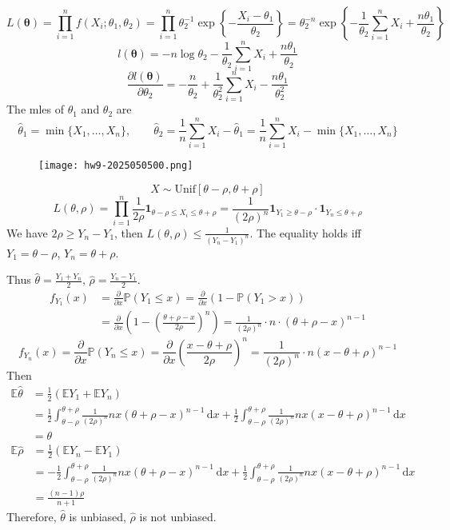 \[
L(\boldsymbol{\theta})=\prod_{i=1}^{n} f(X_i;\theta_1,\theta_2)=\prod_{i=1}^{n}\theta_2^{-1}\exp \left\{  -\frac{X_i-\theta_1}{\theta_2}  \right\}=\theta_2^{-n}\exp \left\{  -\frac{1}{\theta_2}\sum_{i=1}^{n} X_i+\frac{n\theta_1}{\theta_2}  \right\}
\]
\[
l(\boldsymbol{\theta})=-n\log\theta_2-\frac{1}{\theta_2}\sum_{i=1}^{n} X_i+\frac{n\theta_1}{\theta_2}
\]
\[
\frac{ \partial l(\boldsymbol{\theta}) }{ \partial \theta_2 } =-\frac{n}{\theta_2}+\frac{1}{\theta_2^2}\sum_{i=1}^{n} X_i-\frac{n\theta_1}{\theta_2^2}
\]
The mles of $\theta_1$ and $\theta_2$ are
\[
\widehat{\theta}_{1}=\min\{ X_1,\dots,X_n \},\qquad \widehat{\theta}_{2}=\frac{1}{n}\sum_{i=1}^{n} X_i-\widehat{\theta}_{1}=\frac{1}{n}\sum_{i=1}^{n} X_i-\min\{ X_1,\dots,X_n \}
\]
\begin{exercise}
\begin{figure}[H]
\centering
\texttt{[image: hw9-2025050500.png]}
\label{}
\end{figure}
\end{exercise}
\[
X\sim \text{Unif}[\theta-\rho,\theta+\rho]
\]
\[
L(\theta,\rho)=\prod_{i=1}^{n} \frac{1}{2\rho}\mathbf{1}_{\theta-\rho\leq X_i\leq \theta+\rho}=\frac{1}{(2\rho)^n}\mathbf{1}_{Y_1\geq \theta-\rho}\cdot \mathbf{1}_{Y_n\leq \theta+\rho}
\]
We have $2\rho\geq Y_n-Y_1$, then $L(\theta,\rho)\leq\frac{1}{(Y_n-Y_1)^n}$. The equality holds iff $Y_1=\theta-\rho$, $Y_n=\theta+\rho$.

Thus $\widehat{\theta}=\frac{Y_1+Y_n }{2}$, $\widehat{\rho}=\frac{Y_n-Y_1}{2}$.
\[
\begin{aligned}
f_{Y_1}(x) & =\frac{ \partial  }{ \partial x } \mathbb{P}(Y_1\leq x)=\frac{ \partial   }{ \partial x } (1-\mathbb{P}(Y_1>x)) \\
 & =\frac{ \partial   }{ \partial x } \left( 1-\left( \frac{\theta+\rho-x}{2\rho} \right)^n \right)=\frac{1}{(2\rho)^{n}}\cdot n\cdot(\theta+\rho-x)^{n-1}
\end{aligned}
\]
\[
f_{Y_n }(x)=\frac{ \partial   }{ \partial x } \mathbb{P}(Y_n\leq x)=\frac{ \partial   }{ \partial x } \left( \frac{x-\theta+\rho}{2\rho} \right)^{n}=\frac{1}{( 2\rho)^{n}}\cdot n (x-\theta+\rho)^{n-1}
\]
Then
\[
\begin{aligned}
\mathbb{E}\widehat{\theta} & =\frac{1}{2}(\mathbb{E}Y_1+\mathbb{E}Y_n) \\
 & =\frac{1}{2}\int_{\theta-\rho}^{\theta+\rho} \frac{1}{(2\rho)^{n}} nx(\theta+\rho-x)^{n-1} \, \mathrm{d}x +\frac{1}{2}\int_{\theta-\rho}^{\theta+\rho} \frac{1}{(2\rho)^{n}} nx(x-\theta+\rho)^{n-1} \, \mathrm{d}x \\
 & =\theta
\end{aligned}
\]
\[
\begin{aligned}
\mathbb{E}\widehat{\rho} & =\frac{1}{2}(\mathbb{E}Y_n-\mathbb{E}Y_1) \\
 & =-\frac{1}{2}\int_{\theta-\rho}^{\theta+\rho} \frac{1}{(2\rho)^{n}} nx(\theta+\rho-x)^{n-1} \, \mathrm{d}x +\frac{1}{2}\int_{\theta-\rho}^{\theta+\rho} \frac{1}{(2\rho)^{n}} nx(x-\theta+\rho)^{n-1} \, \mathrm{d}x \\
 & =\frac{(n-1) \rho }{n+1}
\end{aligned}
\]
Therefore, $\widehat{\theta}$ is unbiased, $\widehat{\rho}$ is not unbiased.

